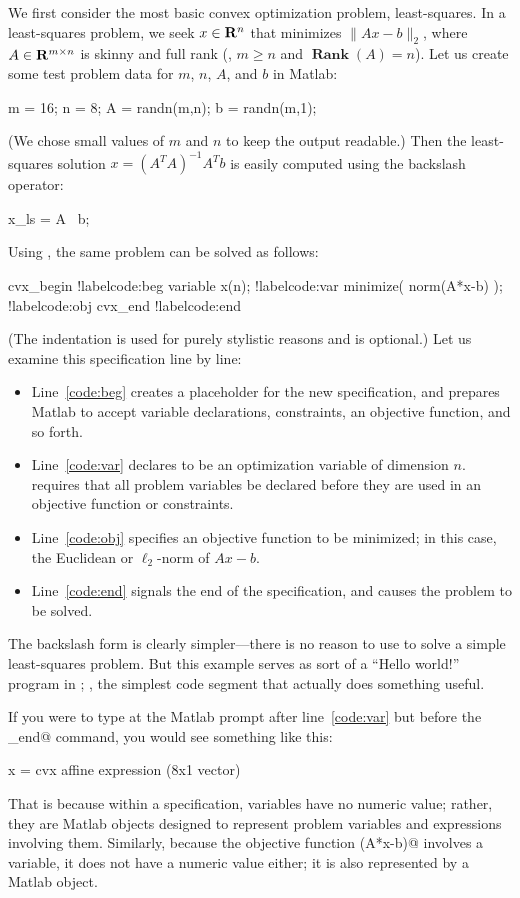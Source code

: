 \documentclass[12pt]{article}
\def\Rank{\operatorname*{\textbf{Rank}}}
\begin{document}
We first consider the most basic convex optimization problem,
least-squares.
In a least-squares problem, we seek $x \in \R^n$
that minimizes $\|Ax-b\|_2$, where $A\in \R^{m \times n}$ is
skinny and full rank (\ie, $m\geq n$ and $\Rank (A)=n$).
Let us create some test problem data for $m$, $n$, $A$, and $b$ in Matlab:
\begin{code2}[firstnumber=15]
	m = 16; n = 8;
	A = randn(m,n);
	b = randn(m,1);
\end{code2}
(We chose small values of $m$ and $n$ to keep the output readable.)
Then the least-squares solution  $x=(A^TA)^{-1}A^Tb$ is easily
computed using the backslash operator: 
\begin{code2}[firstnumber=20]
	x_ls = A \ b;
\end{code2}
Using \cvx, the same problem can be solved as follows:
\begin{code2}[firstnumber=23]
	cvx_begin			!label{code:beg}
	    variable x(n);		!label{code:var}
	    minimize( norm(A*x-b) );	!label{code:obj}
	cvx_end				!label{code:end}
\end{code2}
(The indentation is used for purely stylistic reasons and is optional.) 
Let us examine this specification line by line:
\begin{itemize}
\item Line~\ref{code:beg} creates a placeholder for the
new \cvx specification, and prepares Matlab to accept 
variable declarations, constraints, an objective function, and so forth. 
\item Line~\ref{code:var} declares \verb@x@
to be an optimization variable of dimension $n$. \cvx
requires that all problem variables be declared before they are used in
an objective function or constraints. 
\item Line~\ref{code:obj}
specifies an objective function to be minimized; in this case,
the Euclidean or $\ell_2$-norm
of $Ax-b$. 
\item Line~\ref{code:end} signals the end of the \cvx specification,
and causes the problem to be solved.
\end{itemize}
The backslash form is clearly simpler---there is no reason to use \cvx
to solve a simple least-squares problem. But this
example serves as sort of a ``Hello world!'' program in \cvx;
\ie, the simplest code segment that actually does something useful.

If you were to type \verb@x@ at the
Matlab prompt after line~\ref{code:var} but
before the \verb@cvx_end@ command, you would see something
like this:
\begin{code}
	x =
	    cvx affine expression (8x1 vector)
\end{code}
That is because within a specification, variables have no
numeric value; rather, they are Matlab objects 
designed to represent problem variables and expressions
involving them. Similarly, 
because the objective function \verb@norm(A*x-b)@ 
involves a \cvx variable, it does not have a numeric value either; 
it is also represented by a Matlab object.
\end{document}
